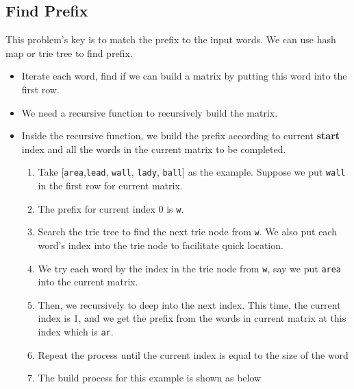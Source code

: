 \subsection{Find Prefix}
This problem's key is to match the prefix to the input words. We can use hash map or trie tree to find prefix.
\begin{itemize}
\item Iterate each word, find if we can build a matrix by putting this word into the first row.
\item We need a recursive function to recursively build the matrix.
\item Inside the recursive function, we build the prefix according to current \textbf{start} index and all the words in the current matrix to be completed.
\begin{enumerate}
\item Take [\texttt{area},\texttt{lead}, \texttt{wall}, \texttt{lady}, \texttt{ball}] as the example. Suppose we put \texttt{wall} in the first row for current matrix.
\item The prefix for current index 0 is \texttt{w}. 
\item Search the trie tree to find the next trie node from \texttt{w}. We also put each word's index into the trie node to facilitate quick location.
\item We try each word by the index in the trie node from \texttt{w}, say we put \texttt{area} into the current matrix.
\item Then, we recursively to deep into the next index. This time, the current index is 1, and we get the prefix from the words in current matrix at this index which is \texttt{ar}.
\item Repeat the process until the current index is equal to the size of the word
\item The build process for this example is shown as below
\begin{figure}[H]
\begin{center}
\end{center}
\end{figure}
\end{enumerate}
\end{itemize}
